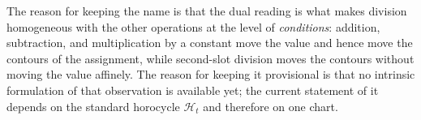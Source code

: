 The reason for keeping the name is that the dual reading is what makes
division homogeneous with the other operations at the level of \emph{conditions}:
addition, subtraction, and multiplication by a constant move the value and
hence move the contours of the assignment, while second-slot division moves the
contours without moving the value affinely.  The reason for keeping it
provisional is that no intrinsic formulation of that observation is available
yet; the current statement of it depends on the standard horocycle
$\mathcal H_t$ and therefore on one chart.
